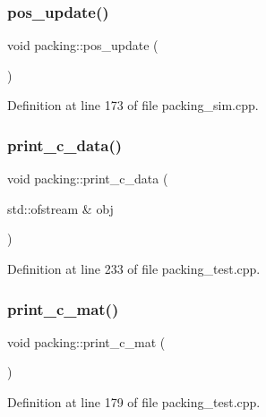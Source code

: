\subsubsection{\texorpdfstring{pos\+\_\+update()}{pos\_update()}}
{\footnotesize\ttfamily void packing\+::pos\+\_\+update (\begin{DoxyParamCaption}{ }\end{DoxyParamCaption})}



Definition at line 173 of file packing\+\_\+sim.\+cpp.

\mbox{\label{classpacking_a4d5591724c0cd87df921dcae97d24305}} 
\subsubsection{\texorpdfstring{print\+\_\+c\+\_\+data()}{print\_c\_data()}}
{\footnotesize\ttfamily void packing\+::print\+\_\+c\+\_\+data (\begin{DoxyParamCaption}\item[{std\+::ofstream \&}]{obj }\end{DoxyParamCaption})}



Definition at line 233 of file packing\+\_\+test.\+cpp.

\mbox{\label{classpacking_ad65b44ad181d5311b6f4b2177b118f82}} 
\subsubsection{\texorpdfstring{print\+\_\+c\+\_\+mat()}{print\_c\_mat()}\hspace{0.1cm}{\footnotesize\ttfamily [1/2]}}
{\footnotesize\ttfamily void packing\+::print\+\_\+c\+\_\+mat (\begin{DoxyParamCaption}{ }\end{DoxyParamCaption})}



Definition at line 179 of file packing\+\_\+test.\+cpp.

\mbox{\label{classpacking_ab6181af7330866576f5f6e5ad42446a3}} 
